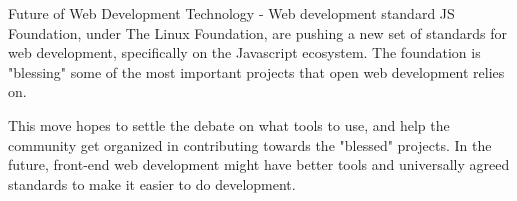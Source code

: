 \documentclass{beamer}
\begin{document}
  \begin{frame}{Future of Web Development Technology - Web development standard}
	JS Foundation, under The Linux Foundation, are pushing a new set of standards for web development, specifically on the Javascript ecosystem. The foundation is "blessing" some of the most important projects that  open web development relies on. 
	
	This move hopes to settle the debate on what tools to use, and help the community get organized in contributing towards the "blessed" projects. In the future, front-end web development might have better tools and universally agreed standards to make it easier to do development.
  \end{frame}
  
  
\end{document}
